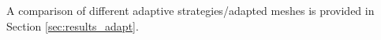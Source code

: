 

	

A comparison of different adaptive strategies/adapted meshes is provided in Section \ref{sec:results_adapt}.

